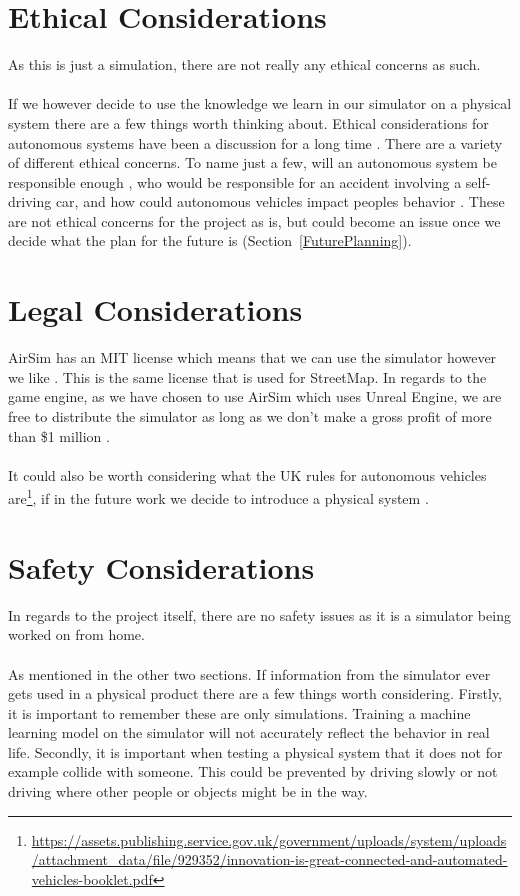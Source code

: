 \section{Ethical Considerations}
As this is just a simulation, there are not really any ethical concerns as such. 
\\~\\
If we however decide to use the knowledge we learn in our simulator on a physical system there are a few things worth thinking about. Ethical considerations for autonomous systems have been a discussion for a long time \cite{ArkinRonaldC2016EaAS, BorensteinJason2019SCaE}. There are a variety of different ethical concerns. To name just a few, will an autonomous system be responsible enough \cite{BorensteinJason2019SCaE}, who would be responsible for an accident involving a self-driving car, and how could autonomous vehicles impact peoples behavior \cite{moralComputers}. These are not ethical concerns for the project as is, but could become an issue once we decide what the plan for the future is (Section~\ref{FuturePlanning}). 

\section{Legal Considerations}
AirSim has an MIT license which means that we can use the simulator however we like \cite{MITLicense}. This is the same license that is used for StreetMap. In regards to the game engine, as we have chosen to use AirSim which uses Unreal Engine, we are free to distribute the simulator as long as we don't make a gross profit of more than \$1 million \cite{UE5}. 
\\~\\
It could also be worth considering what the UK rules for autonomous vehicles are\footnote{\url{https://assets.publishing.service.gov.uk/government/uploads/system/uploads/attachment_data/file/929352/innovation-is-great-connected-and-automated-vehicles-booklet.pdf}}, if in the future work we decide to introduce a physical system \cite{UKAutoRules, UKAutoRulesGov2}. 


\section{Safety Considerations}
In regards to the project itself, there are no safety issues as it is a simulator being worked on from home. 
\\~\\
As mentioned in the other two sections. If information from the simulator ever gets used in a physical product there are a few things worth considering. Firstly, it is important to remember these are only simulations. Training a machine learning model on the simulator will not accurately reflect the behavior in real life. Secondly, it is important when testing a physical system that it does not for example collide with someone. This could be prevented by driving slowly or not driving where other people or objects might be in the way.